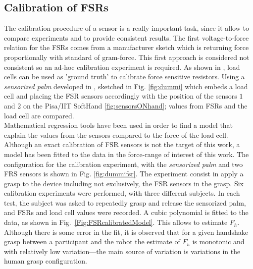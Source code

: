 
\subsection{Calibration of FSRs}\label{subsec:calibFSR}
The calibration procedure of a sensor is a really important task, since it allow to compare experiments and to provide consistent results. 
The first voltage-to-force relation for the FSRs comes from a manufacturer sketch which is returning force proportionally with standard of gram-force. This first approach is considered not consistent so an ad-hoc calibration experiment is required.
As shown in \cite{calibFSR}, load cells can be used as 'ground truth' to calibrate force sensitive resistors.%
Using a \textit{sensorized palm} developed in \cite{knoop2017handshakiness}, sketched in Fig. \ref{fig:dummi} which embeds a load cell and placing the FSR sensors accordingly with the position of the sensors $1$ and $2$ on the Pisa/IIT SoftHand \ref{fig:sensorsONhand}; values from FSRs and the load cell are compared.\\
Mathematical regression tools have been used in order to find a model that explain the values from the sensors compared to the force of the load cell.
Although an exact calibration of FSR sensors is not the target of this work, a model has been fitted to the data in the force-range of interest of this work.
The configuration for the calibration experiment, with the \textit{sensorized palm} and two FRS sensors is shown in Fig. \ref{fig:dummifsr}. 
The experiment consist in apply a grasp to the device including not exclusively, the FSR sensors in the grasp. Six calibration experiments were performed, with three different subjects. In each test, the subject was asked to repeatedly grasp and release the sensorized palm, and FSRs and load cell values were recorded. A cubic polynomial is fitted to the data, as shown in Fig.~\ref{Fig:FSRcalibratedModel}. This allows to estimate $F_{h}$. Although there is some error in the fit, it is observed that for a given handshake grasp between a participant and the robot the estimate of $F_{h}$ is monotonic and with relatively low variation---the main source of variation is variations in the human grasp configuration.%

